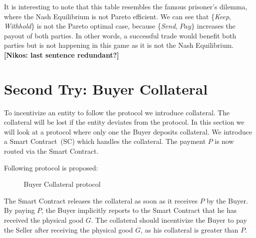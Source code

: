 \documentclass{cacthesis}
\newcommand{\authnote}[3]{{ \footnotesize \textbf{#1[#2: #3]~}}}
\newcommand{\orfnote}[1]{\authnote{\color{blue}}{Orfeas}{#1}}
\newcommand{\niknote}[1]{\authnote{\color{red}}{Nikos}{#1}}
\begin{document}
It is interesting to note that this table resembles the famous prisoner's dilemma, where the Nash Equilibrium is not Pareto efficient. We can see that \{\emph{Keep}, \emph{Withhold}\} is not the Pareto optimal case, because \{\emph{Send}, $Pay\}$ increases the payout of both parties. 
In other words, a successful trade would benefit both parties but is not happening in this game as it is not the Nash Equilibrium. \niknote{last sentence redundant?}



\section{Second Try: Buyer Collateral}
\label{sec:buyer-collateral}
To incentivize an entity to follow the protocol we introduce collateral. The collateral will be lost if the entity deviates from the protocol. In this section we will look at a protocol where only one the Buyer deposits collateral. We introduce a Smart Contract~(SC) which handles the collateral. The payment $P$ is now routed via the Smart Contract.  \newline

Following protocol is proposed:
\begin{figure}[htb!]
    \centering
    \caption{Buyer Collateral protocol}
    \label{pro:buyer-col}
\end{figure}

The Smart Contract releases the collateral as soon as it receives $P$ by the Buyer. By paying $P$, the Buyer implicitly reports to the Smart Contract that he has received the physical good $G$. The collateral should incentivize the Buyer to pay the Seller after receiving the physical good $G$, as his collateral is greater than $P$.\newline
\end{document}

